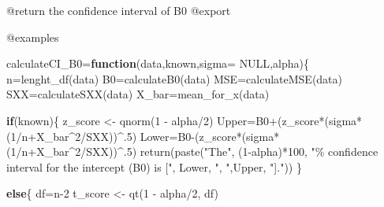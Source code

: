 \documentclass[
]{article}
\newenvironment{Shaded}{\begin{snugshade}}{\end{snugshade}}
\newcommand{\AttributeTok}[1]{\textcolor[rgb]{0.77,0.63,0.00}{#1}}
\newcommand{\ConstantTok}[1]{\textcolor[rgb]{0.00,0.00,0.00}{#1}}
\newcommand{\ControlFlowTok}[1]{\textcolor[rgb]{0.13,0.29,0.53}{\textbf{#1}}}
\newcommand{\DecValTok}[1]{\textcolor[rgb]{0.00,0.00,0.81}{#1}}
\newcommand{\FunctionTok}[1]{\textcolor[rgb]{0.00,0.00,0.00}{#1}}
\newcommand{\NormalTok}[1]{#1}
\newcommand{\OtherTok}[1]{\textcolor[rgb]{0.56,0.35,0.01}{#1}}
\newcommand{\SpecialCharTok}[1]{\textcolor[rgb]{0.00,0.00,0.00}{#1}}
\newcommand{\StringTok}[1]{\textcolor[rgb]{0.31,0.60,0.02}{#1}}
\begin{document}
@return the confidence interval of B0 @export

@examples

\begin{Shaded}
\begin{Highlighting}[]
\NormalTok{calculateCI\_B0}\OtherTok{=}\ControlFlowTok{function}\NormalTok{(data,known,}\AttributeTok{sigma=} \ConstantTok{NULL}\NormalTok{,alpha)\{}
\NormalTok{  n}\OtherTok{=}\FunctionTok{lenght\_df}\NormalTok{(data)}
\NormalTok{  B0}\OtherTok{=}\FunctionTok{calculateB0}\NormalTok{(data)}
\NormalTok{  MSE}\OtherTok{=}\FunctionTok{calculateMSE}\NormalTok{(data)}
\NormalTok{  SXX}\OtherTok{=}\FunctionTok{calculateSXX}\NormalTok{(data)}
\NormalTok{  X\_bar}\OtherTok{=}\FunctionTok{mean\_for\_x}\NormalTok{(data)}
  
  \ControlFlowTok{if}\NormalTok{(known)\{}
\NormalTok{    z\_score }\OtherTok{\textless{}{-}} \FunctionTok{qnorm}\NormalTok{(}\DecValTok{1} \SpecialCharTok{{-}}\NormalTok{ alpha}\SpecialCharTok{/}\DecValTok{2}\NormalTok{)}
\NormalTok{    Upper}\OtherTok{=}\NormalTok{B0}\SpecialCharTok{+}\NormalTok{(z\_score}\SpecialCharTok{*}\NormalTok{(sigma}\SpecialCharTok{*}\NormalTok{(}\DecValTok{1}\SpecialCharTok{/}\NormalTok{n}\SpecialCharTok{+}\NormalTok{X\_bar}\SpecialCharTok{\^{}}\DecValTok{2}\SpecialCharTok{/}\NormalTok{SXX))}\SpecialCharTok{\^{}}\NormalTok{.}\DecValTok{5}\NormalTok{)}
\NormalTok{    Lower}\OtherTok{=}\NormalTok{B0}\SpecialCharTok{{-}}\NormalTok{(z\_score}\SpecialCharTok{*}\NormalTok{(sigma}\SpecialCharTok{*}\NormalTok{(}\DecValTok{1}\SpecialCharTok{/}\NormalTok{n}\SpecialCharTok{+}\NormalTok{X\_bar}\SpecialCharTok{\^{}}\DecValTok{2}\SpecialCharTok{/}\NormalTok{SXX))}\SpecialCharTok{\^{}}\NormalTok{.}\DecValTok{5}\NormalTok{)}
    \FunctionTok{return}\NormalTok{(}\FunctionTok{paste}\NormalTok{(}\StringTok{"The"}\NormalTok{, (}\DecValTok{1}\SpecialCharTok{{-}}\NormalTok{alpha)}\SpecialCharTok{*}\DecValTok{100}\NormalTok{, }\StringTok{"\% confidence interval for the intercept (B0) is ["}\NormalTok{, Lower, }\StringTok{", "}\NormalTok{,Upper, }\StringTok{"]."}\NormalTok{))}
\NormalTok{  \}}
  
  \ControlFlowTok{else}\NormalTok{\{}
\NormalTok{    df}\OtherTok{=}\NormalTok{n}\DecValTok{{-}2}
\NormalTok{    t\_score }\OtherTok{\textless{}{-}} \FunctionTok{qt}\NormalTok{(}\DecValTok{1} \SpecialCharTok{{-}}\NormalTok{ alpha}\SpecialCharTok{/}\DecValTok{2}\NormalTok{, df)}
    

\end{Highlighting}
\end{Shaded}
\end{document}

